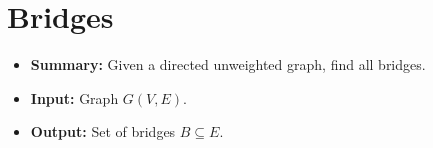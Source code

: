 \section{Bridges} \label{algorithm-bridges}
\begin{itemize}
    \item \textbf{Summary:} Given a directed unweighted graph, find all bridges.
    \item \textbf{Input:} Graph $G(V,E)$.
    \item \textbf{Output:} Set of bridges $B \subseteq E$.
\end{itemize}

